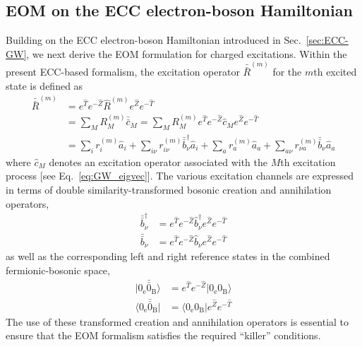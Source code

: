 \subsection{EOM on the ECC electron-boson Hamiltonian}
\label{sec:EOMECC-GW}

Building on the ECC electron-boson Hamiltonian introduced in Sec.~\ref{sec:ECC-GW}, we next derive the EOM formulation for charged excitations.
Within the present ECC-based formalism, the excitation operator $\bar{\bar{R}}^{(m)}$ for the $m$th excited state is defined as 
\begin{equation}
\begin{split}
    \bar{\bar{R}}^{(m)}
		& = e^{\hat{T}} e^{-\hat{Z}} \hat{R}^{(m)} e^{\hat{Z}} e^{-\hat{T}}\\
		& = \sum_M R^{(m)}_M \bar{\bar{c}}_M 
		= \sum_M R^{(m)}_M e^{\hat{T}} e^{-\hat{Z}} \hat{c}_M  e^{\hat{Z}} e^{-\hat{T}} 
		\\ 
        & = \sum_i r^{(m)}_i \hat{a}_i + \sum_{i\nu} r^{(m)}_{i \nu } \bar{\bar{b}}^\dagger_{\nu} \hat{a}_i
        + \sum_a r^{(m)}_a \hat{a}_a  + \sum_{a\nu} r^{(m)}_{\nu a  } \bar{\bar{b}}_{\nu} \hat{a}_a
		\label{eq:ExcOp}
\end{split}
\end{equation}
where $\hat{c}_M$ denotes an excitation operator associated with the $M$th excitation process [see Eq.~\eqref{eq:GW_eigvec}].
The various excitation channels are expressed in terms of double similarity-transformed bosonic creation and annihilation operators,
\begin{subequations}
\begin{align}
	\bar{\bar{b}}^\dagger_{\nu} & = e^{\hat{T}} e^{-\hat{Z}} \hat{b}^\dagger_{\nu} e^{\hat{Z}} e^{-\hat{T}} 
	\\ 
	\bar{\bar{b}}_{\nu} & = e^{\hat{T}} e^{-\hat{Z}} \hat{b}_{\nu} e^{\hat{Z}} e^{-\hat{T}}
\end{align}
\end{subequations}
as well as the corresponding left and right reference states in the combined fermionic-bosonic space,
\begin{subequations}
\begin{align}
	|0_{\mathrm{e}}\bar{\bar{0}}_{\mathrm{B}}\rangle & = e^{\hat{T}} e^{-\hat{Z}} |0_{\mathrm{e}}0_{\mathrm{B}}\rangle 
	\\
	\langle 0_{\mathrm{e}}\bar{\bar{0}}_{\mathrm{B}}| & = \langle 0_{\mathrm{e}}0_{\mathrm{B}}| e^{\hat{Z}} e^{-\hat{T}}
\end{align}
\end{subequations}
The use of these transformed creation and annihilation operators is essential to ensure that the EOM formalism satisfies the required ``killer'' conditions.

